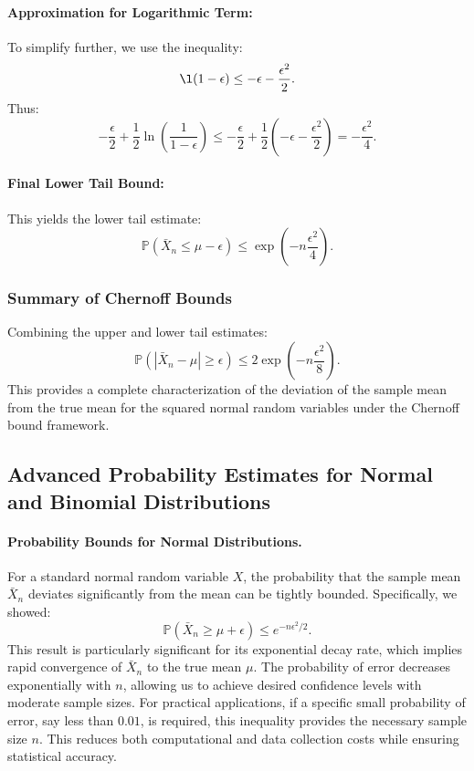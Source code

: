 \paragraph{
Approximation for Logarithmic Term:}
To simplify further, we use the inequality:
\[
\l(1 - \epsilon) \leq -\epsilon - \frac{\epsilon^2}{2}.
\]
Thus:
\[
-\frac{\epsilon}{2} + \frac{1}{2} \ln\left(\frac{1}{1 - \epsilon}\right) \leq -\frac{\epsilon}{2} + \frac{1}{2}(-\epsilon - \frac{\epsilon^2}{2}) = -\frac{\epsilon^2}{4}.
\]

\paragraph{Final Lower Tail Bound:}
This yields the lower tail estimate:
\[
\mathbb{P}\left(\bar{X}_n \leq \mu - \epsilon\right) \leq \exp\left(-n \frac{\epsilon^2}{4}\right).
\]

\subsubsection{Summary of Chernoff Bounds}
Combining the upper and lower tail estimates:
\[
\mathbb{P}(|\bar{X}_n - \mu| \geq \epsilon) \leq 2 \exp\left(-n \frac{\epsilon^2}{8}\right).
\]
This provides a complete characterization of the deviation of the sample mean from the true mean for the squared normal random variables under the Chernoff bound framework.

\subsection{Advanced Probability Estimates for Normal and Binomial Distributions}

\paragraph{Probability Bounds for Normal Distributions.}
For a standard normal random variable \( X \), the probability that the sample mean \( \bar{X}_n \) deviates significantly from the mean can be tightly bounded. Specifically, we showed:
\[
\mathbb{P}(\bar{X}_n \geq \mu + \epsilon) \leq e^{-n\epsilon^2 / 2}.
\]
This result is particularly significant for its exponential decay rate, which implies rapid convergence of \( \bar{X}_n \) to the true mean \( \mu \). The probability of error decreases exponentially with \( n \), allowing us to achieve desired confidence levels with moderate sample sizes. \newline
For practical applications, if a specific small probability of error, say less than \( 0.01 \), is required, this inequality provides the necessary sample size \( n \). This reduces both computational and data collection costs while ensuring statistical accuracy.

